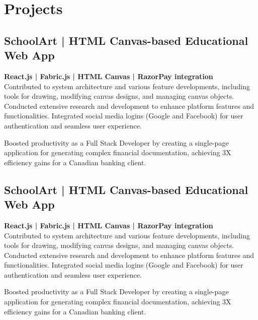 \documentclass[letterpaper]{deedy-resume} %
\begin{document}
\begin{minipage}[t]{0.66\textwidth} %



\section{Projects}




\subsection{SchoolArt | HTML Canvas-based Educational Web App}


\textbf{React.js | Fabric.js | HTML Canvas | RazorPay integration} \\

Contributed to system architecture and various feature developments, including tools for drawing, modifying canvas designs, and managing canvas objects.
Conducted extensive research and development to enhance platform features and functionalities.
Integrated social media logins (Google and Facebook) for user authentication and seamless user experience.
\newpage

Boosted productivity as a Full Stack Developer by creating a single-page application for generating complex financial documentation, achieving 3X efficiency gains for a Canadian banking client.

\sectionspace %




\subsection{SchoolArt | HTML Canvas-based Educational Web App}


\textbf{React.js | Fabric.js | HTML Canvas | RazorPay integration} \\

Contributed to system architecture and various feature developments, including tools for drawing, modifying canvas designs, and managing canvas objects.
Conducted extensive research and development to enhance platform features and functionalities.
Integrated social media logins (Google and Facebook) for user authentication and seamless user experience.
\newpage

Boosted productivity as a Full Stack Developer by creating a single-page application for generating complex financial documentation, achieving 3X efficiency gains for a Canadian banking client.

\sectionspace %


\end{minipage} %
\end{document}

